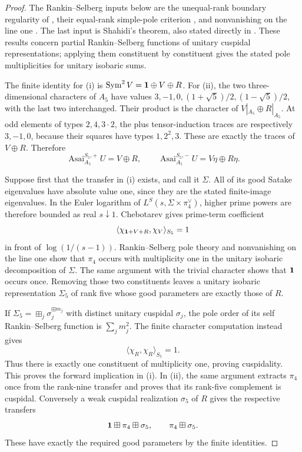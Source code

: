 \begin{proof}
The Rankin--Selberg inputs below are the unequal-rank boundary regularity of \citet[Proposition~3.3, p.~795]{jacquetshalika1981ii}, their equal-rank simple-pole criterion \citep[Proposition~3.6, pp.~802--804]{jacquetshalika1981ii}, and nonvanishing on the line one \citep[Theorem~3.7, p.~804]{jacquetshalika1981ii}. The last input is Shahidi's theorem, also stated directly in \citet[p.~462]{shahidi1980}. These results concern partial Rankin--Selberg functions of unitary cuspidal representations; applying them constituent by constituent gives the stated pole multiplicities for unitary isobaric sums.

The finite identity for (i) is $\operatorname{Sym}^2V=\mathbf 1\oplus V\oplus R$. For (ii), the two three-dimensional characters of $A_5$ have values $3,-1,0,(1+\sqrt5)/2,(1-\sqrt5)/2$, with the last two interchanged. Their product is the character of $V|_{A_5}\oplus R|_{A_5}$. At odd elements of types $2,4,3\cdot2$, the plus tensor-induction traces are respectively $3,-1,0$, because their squares have types $1,2^2,3$. These are exactly the traces of $V\oplus R$. Therefore
\[
\operatorname{Asai}_{A_5}^{S_5,+}U=V\oplus R,
\qquad
\operatorname{Asai}_{A_5}^{S_5,-}U=V\eta\oplus R\eta.
\]

Suppose first that the transfer in (i) exists, and call it $\Sigma$. All of its good Satake eigenvalues have absolute value one, since they are the stated finite-image eigenvalues. In the Euler logarithm of $L^S(s,\Sigma\times\pi_4^\vee)$, higher prime powers are therefore bounded as real $s\downarrow1$. Chebotarev gives prime-term coefficient
\[
\langle\chi_{\mathbf 1+V+R},\chi_V\rangle_{S_5}=1
\]
in front of $\log(1/(s-1))$. Rankin--Selberg pole theory and nonvanishing on the line one show that $\pi_4$ occurs with multiplicity one in the unitary isobaric decomposition of $\Sigma$. The same argument with the trivial character shows that $\mathbf 1$ occurs once. Removing those two constituents leaves a unitary isobaric representation $\Sigma_5$ of rank five whose good parameters are exactly those of $R$.

If $\Sigma_5=\boxplus_j\sigma_j^{\boxplus m_j}$ with distinct unitary cuspidal $\sigma_j$, the pole order of its self Rankin--Selberg function is $\sum_jm_j^2$. The finite character computation instead gives
\[
\langle\chi_R,\chi_R\rangle_{S_5}=1.
\]
Thus there is exactly one constituent of multiplicity one, proving cuspidality. This proves the forward implication in (i). In (ii), the same argument extracts $\pi_4$ once from the rank-nine transfer and proves that its rank-five complement is cuspidal. Conversely a weak cuspidal realization $\sigma_5$ of $R$ gives the respective transfers
\[
\mathbf 1\boxplus\pi_4\boxplus\sigma_5,
\qquad
\pi_4\boxplus\sigma_5.
\]
These have exactly the required good parameters by the finite identities.


\end{proof}
